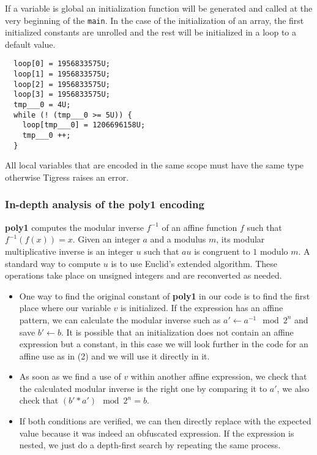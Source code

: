 \documentclass{projectreport}
\begin{document}
If a variable is global an initialization function will be generated and called at the very beginning of the \verb|main|. In the case of the initialization of an array, the first initialized constants are unrolled and the rest will be initialized in a loop to a default value. 

\begin{verbatim}
  loop[0] = 1956833575U;
  loop[1] = 1956833575U;
  loop[2] = 1956833575U;
  loop[3] = 1956833575U;
  tmp___0 = 4U;
  while (! (tmp___0 >= 5U)) {
    loop[tmp___0] = 1206696158U;
    tmp___0 ++;
  }
\end{verbatim}

All local variables that are encoded in the same scope must have the same type otherwise Tigress raises an error.

\subsubsection{In-depth analysis of the poly1 encoding}

\textbf{\textsf{poly1}} computes the modular inverse $f^{-1}$ of an affine function $f$ such that $f^{-1}(f(x)) = x$. Given an integer $a$ and a modulus $m$, its modular multiplicative inverse
is an integer $u$ such that $au$ is congruent to $1$ modulo $m$. A standard way to compute $u$ is to use Euclid's extended algorithm. These operations take place on unsigned integers and are reconverted as needed.

\begin{itemize}
    \item One way to find the original constant of \textbf{\textsf{poly1}} in our code is to find the first place where our variable $v$ is initialized. If the expression has an affine pattern, we can calculate the modular inverse such as $a' \gets a^{-1} \mod 2^n$ and save $b' \gets b$. It is possible that an initialization does not contain an affine expression but a constant, in this case we will look further in the code for an affine use as in (2) and we will use it directly in it.
    \item As soon as we find a use of $v$ within another affine expression, we check that the calculated modular inverse is the right one by comparing it to $a'$, we also check that $(b' * a') \mod 2^n = b$.
    \item If both conditions are verified, we can then directly replace with the expected value because it was indeed an obfuscated expression. If the expression is nested, we just do a depth-first search by repeating the same process.
\end{itemize}
\end{document}
